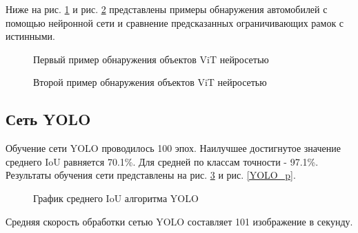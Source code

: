 \documentclass[14pt,a4paper]{extarticle}
\begin{document}
Ниже на рис. \ref{result1} и рис. \ref{result4} представлены примеры обнаружения автомобилей с помощью нейронной сети и сравнение предсказанных ограничивающих рамок с истинными.

\newpage
\begin{figure}[h]
\begin{minipage}[h]{0.49\linewidth}
\end{minipage}
\hfill
\begin{minipage}[h]{0.49\linewidth}
\end{minipage}
\vspace*{0.3cm}\caption{Первый пример обнаружения объектов ViT нейросетью}
\label{result1}
\end{figure}


\begin{figure}[h!]
\begin{minipage}[h]{0.49\linewidth}
\end{minipage}
\hfill
\begin{minipage}[h]{0.49\linewidth}
\end{minipage}
\vspace*{0.3cm}\caption{Второй пример обнаружения объектов ViT нейросетью}
\label{result4}
\end{figure} 

\newpage
{}
\subsection{Сеть YOLO}
Обучение сети YOLO проводилось 100 эпох. Наилучшее достигнутое значение среднего IoU равняется 70.1\%. Для средней по классам точности - 97.1\%. Результаты обучения сети представлены на рис. \ref{YOLO_IoU} и рис. \ref{YOLO_p}.

\begin{figure}[h!]
\caption{График среднего IoU алгоритма YOLO}
\label{YOLO_IoU}
\end{figure} 
\newpage
Средняя скорость обработки сетью YOLO составляет 101 изображение в секунду.
\end{document}
